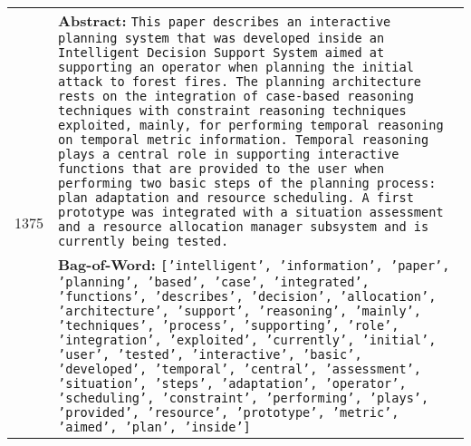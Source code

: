 \begin{table}[!h]
{\begin{tabular}{p{1cm} p{12cm}}
             \multirow{2}{*}{1375} & \textbf{Abstract:} {\tt This paper describes an interactive planning system that was developed inside an Intelligent Decision Support System aimed at supporting an operator when planning the initial attack to forest fires. The planning architecture rests on the integration of case-based reasoning techniques with constraint reasoning techniques exploited, mainly, for performing temporal reasoning on temporal metric information. Temporal reasoning plays a central role in supporting interactive functions that are provided to the user when performing two basic steps of the planning process: plan adaptation and resource scheduling. A first prototype was integrated with a situation assessment and a resource allocation manager subsystem and is currently being tested.} \\
             & \textbf{Bag-of-Word:} {\tt ['intelligent', 'information', 'paper', 'planning', 'based', 'case', 'integrated', 'functions', 'describes', 'decision', 'allocation', 'architecture', 'support', 'reasoning', 'mainly', 'techniques', 'process', 'supporting', 'role', 'integration', 'exploited', 'currently', 'initial', 'user', 'tested', 'interactive', 'basic', 'developed', 'temporal', 'central', 'assessment', 'situation', 'steps', 'adaptation', 'operator', 'scheduling', 'constraint', 'performing', 'plays', 'provided', 'resource', 'prototype', 'metric', 'aimed', 'plan', 'inside']} \\
             
             \midrule
             

\end{tabular}}
\end{table}
